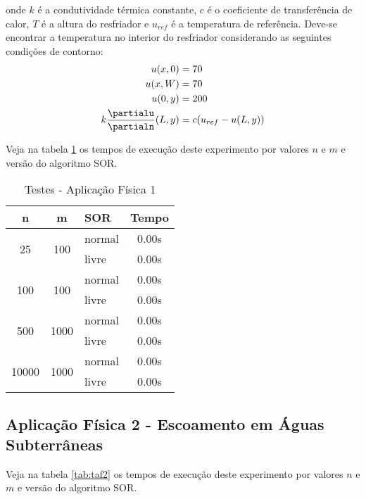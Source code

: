 \documentclass[
	11pt,				%
	oneside,			%
	a4paper,			%
	english,			%
	brazil,				%
	]{article}
\begin{document}
\noindent onde $k$ é a condutividade térmica constante, $c$ é o coeficiente de
transferência de calor, $T$ é a altura do resfriador e $u_{ref}$ é a
temperatura de referência. Deve-se encontrar a temperatura no interior
do resfriador considerando as seguintes condições de contorno:
\begin{align*}
u(x,0) &= 70\\
u(x,W) &= 70\\
u(0,y) &= 200\\
k\frac{\partialu}{\partialn}(L,y) &= c(u_{ref} - u(L,y))
\end{align*}

Veja na tabela \ref{tab:taf1} os tempos de execução deste experimento
por valores $n$ e $m$ e versão do algoritmo SOR.

\begin{table}[ht]
\centering
\begin{tabular}{|c|c|l|c|}
\hline 
\textbf{n} & \textbf{m} & \textbf{SOR} & \textbf{Tempo} \\
\hline
\multirow{2}{*}{25}    & \multirow{2}{*}{100}  & normal & 0.00s \\
                       &                       & livre  & 0.00s \\
\hline
\multirow{2}{*}{100}   & \multirow{2}{*}{100}  & normal & 0.00s \\
                       &                       & livre  & 0.00s \\
\hline
\multirow{2}{*}{500}   & \multirow{2}{*}{1000} & normal & 0.00s \\
                       &                       & livre  & 0.00s \\
\hline
\multirow{2}{*}{10000} & \multirow{2}{*}{1000} & normal & 0.00s \\
                       &                       & livre  & 0.00s \\
\hline
\end{tabular}
\caption{Testes - Aplicação Física 1}
\label{tab:taf1}
\end{table}

\subsection{Aplicação Física 2 - Escoamento em Águas Subterrâneas}
\lipsum[9]

Veja na tabela \ref{tab:taf2} os tempos de execução deste experimento
por valores $n$ e $m$ e versão do algoritmo SOR.
\end{document}
